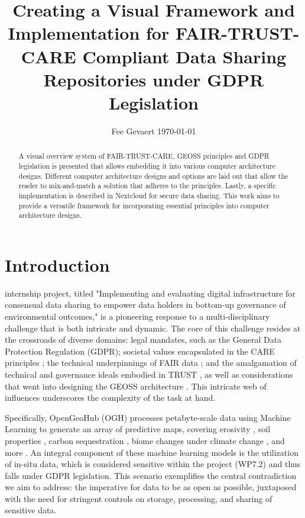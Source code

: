 \documentclass[journal, dvipsnames]{IEEEtran}
\title{Creating a Visual Framework and Implementation for FAIR-TRUST-CARE Compliant Data Sharing Repositories under GDPR Legislation}
\author{Fee Gevaert \orcidlink{https://orcid.org/0009-0008-2311-6336} \today{}}
\begin{document}
\maketitle

\begin{abstract}
A visual overview system of FAIR-TRUST-CARE, GEOSS principles and GDPR legislation is presented that allows embedding it into various computer architecture designs. Different computer architecture designs and options are laid out that allow the reader to mix-and-match a solution that adheres to the principles. Lastly, a specific implementation is described in Nextcloud for secure data sharing. This work aims to provide a versatile framework for incorporating essential principles into computer architecture designs.
\end{abstract}

\section{Introduction}
 internship project, titled "Implementing and evaluating digital infrastructure for consensual data sharing to empower data holders in bottom-up governance of environmental outcomes," is a pioneering response to a multi-disciplinary challenge that is both intricate and dynamic. The core of this challenge resides at the crossroads of diverse domains: legal mandates, such as the General Data Protection Regulation (GDPR); societal values encapsulated in the CARE principles \cite{carrollCAREPrinciplesIndigenous2020}; the technical underpinnings of FAIR data \cite{jacobsenFAIRPrinciplesInterpretations2020, wilkinsonFAIRGuidingPrinciples2016, lamprechtFAIRPrinciplesResearch2020}; and the amalgamation of technical and governance ideals embodied in TRUST \cite{linTRUSTPrinciplesDigital2020}, as well as considerations that went into designing the GEOSS architecture \cite{christianGEOSSArchitecturePrinciples2008}. This intricate web of influences underscores the complexity of the task at hand.

Specifically, OpenGeoHub (OGH) processes petabyte-scale data using Machine Learning \cite{bouasriaPredictivePerformanceMachine2023a} to generate an array of predictive maps, covering erosivity \cite{panagosGlobalRainfallErosivity2023}, soil properties \cite{henglSoilGrids250mGlobalGridded2017}, carbon sequestration \cite{maxwellGlobalMangroveSoil2023}, biome changes under climate change \cite{bonannellaBiomesWorldClimate2023}, and more \cite{hacklanderLandPotentialAssessment2023}. An integral component of these machine learning models is the utilization of in-situ data, which is considered sensitive within the project (WP7.2) and thus falls under GDPR legislation. This scenario exemplifies the central contradiction we aim to address: the imperative for data to be as open as possible, juxtaposed with the need for stringent controls on storage, processing, and sharing of sensitive data.
\end{document}
